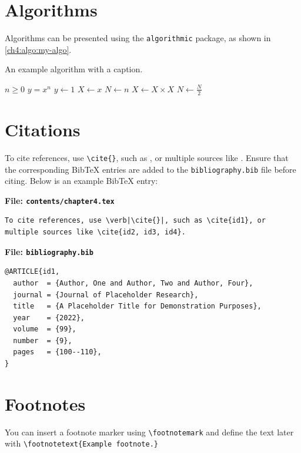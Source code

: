 \section{Algorithms}
\begin{paragraph}
Algorithms can be presented using the \texttt{algorithmic} package, as shown in \autoref{ch4:algo:my-algo}.
\end{paragraph}

\begin{algorithm}[h]
\caption{An example algorithm with a caption.}
\label{ch4:algo:my-algo}
\small\singlespacing
\begin{algorithmic}[1]
    \Require $n \geq 0$
    \Ensure $y = x^n$
    \State $y \gets 1$
    \State $X \gets x$
    \State $N \gets n$
            \State $X \gets X \times X$
            \State $N \gets \frac{N}{2}$ 
    \EndWhile
\end{algorithmic}
\end{algorithm}



\section{Citations}
\begin{paragraph}
To cite references, use \verb|\cite{}|, such as \cite{id1}, or multiple sources like \cite{id2, id3, id4}. Ensure that the corresponding BibTeX entries are added to the \texttt{bibliography.bib} file before citing. Below is an example BibTeX entry:
\end{paragraph}

\noindent\textbf{File: \texttt{contents/chapter4.tex}}\vspace{-1em}
\begin{verbatim}
To cite references, use \verb|\cite{}|, such as \cite{id1}, or multiple sources like \cite{id2, id3, id4}.
\end{verbatim}

\noindent\textbf{File: \texttt{bibliography.bib}}\vspace{-1em}
\begin{verbatim}
@ARTICLE{id1,
  author  = {Author, One and Author, Two and Author, Four},
  journal = {Journal of Placeholder Research}, 
  title   = {A Placeholder Title for Demonstration Purposes}, 
  year    = {2022},
  volume  = {99},
  number  = {9},
  pages   = {100--110},
}
\end{verbatim}

\section{Footnotes}
\begin{paragraph}
You can insert a footnote marker using \verb|\footnotemark|\footnotemark{} and define the text later with \verb|\footnotetext{Example footnote.}|
\end{paragraph}